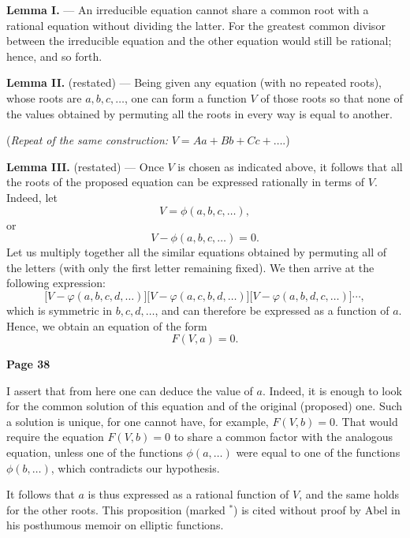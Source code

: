 \documentclass{article}
\begin{document}
\medskip

\noindent
\textbf{Lemma I.} --- An irreducible equation cannot share a common root with a rational equation without dividing the latter. For the greatest common divisor between the irreducible equation and the other equation would still be rational; hence, and so forth.

\smallskip

\noindent
\textbf{Lemma II.} (restated) --- Being given any equation (with no repeated roots), whose roots are \(a, b, c, \dots\), one can form a function \(V\) of those roots so that none of the values obtained by permuting all the roots in every way is equal to another.

\medskip

\noindent
(\textit{Repeat of the same construction:} \(V = A a + B b + C c + \dots\).)

\medskip

\noindent
\textbf{Lemma III.} (restated) --- Once \(V\) is chosen as indicated above, it follows that all the roots of the proposed equation can be expressed rationally in terms of \(V\). Indeed, let
\[
V = \phi(a, b, c, \dots),
\]
or
\[
V - \phi(a, b, c, \dots) = 0.
\]
Let us multiply together all the similar equations obtained by permuting 
all of the letters (with only the first letter remaining fixed). We then arrive 
at the following expression:
\[
\bigl[V - \varphi(a, b, c, d,\dots)\bigr]
\bigl[V - \varphi(a, c, b, d,\dots)\bigr]
\bigl[V - \varphi(a, b, d, c,\dots)\bigr]
\cdots,
\]
which is symmetric in $b, c, d,\dots$, and can therefore be expressed 
as a function of $a$. Hence, we obtain an equation of the form
\[
F(V, a) = 0.
\]

\bigskip

\noindent
\textbf{Page 38}

\medskip

\noindent
I assert that from here one can deduce the value of \(a\). Indeed, it is enough to look for the common solution of this equation and of the original (proposed) one. Such a solution is unique, for one cannot have, for example, \(F(V, b) = 0\). That would require the equation \(F(V, b) = 0\) to share a common factor with the analogous equation, unless one of the functions \(\phi(a, \dots)\) were equal to one of the functions \(\phi(b, \dots)\), which contradicts our hypothesis.

\smallskip

\noindent
It follows that \(a\) is thus expressed as a rational function of \(V\), and the same holds for the other roots. This proposition (marked \(^*\)) is cited without proof by Abel in his posthumous memoir on elliptic functions.
\end{document}
